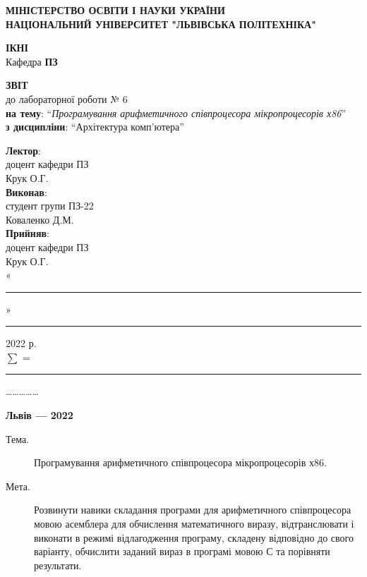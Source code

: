\documentclass{article}
\newcommand\subject{Архітектура комп'ютера}
\newcommand\lecturer{доцент кафедри ПЗ\\Крук О.Г.}
\newcommand\teacher{доцент кафедри ПЗ\\Крук О.Г.}
\newcommand\mygroup{ПЗ-22}
\newcommand\lab{6}
\newcommand\theme{Програмування арифметичного співпроцесора мікропроцесорів х86}
\newcommand\purpose{Розвинути навики складання програми для арифметичного співпроцесора мовою асемблера для обчислення математичного виразу, відтранслювати і виконати в режимі відлагодження програму, складену відповідно до свого варіанту, обчислити заданий вираз в програмі мовою С та порівняти результати}
\begin{document}
\begin{normalsize}
	\begin{titlepage}
		\thispagestyle{empty}
		\begin{center}
			\textbf{МІНІСТЕРСТВО ОСВІТИ І НАУКИ УКРАЇНИ\\
				НАЦІОНАЛЬНИЙ УНІВЕРСИТЕТ "ЛЬВІВСЬКА ПОЛІТЕХНІКА"}
		\end{center}
		\begin{flushright}
			\textbf{ІКНІ}\\
			Кафедра \textbf{ПЗ}
		\end{flushright}
		\vspace{200pt}
		\begin{center}
			\textbf{ЗВІТ}\\
			\vspace{10pt}
			до лабораторної роботи № \lab\\
			\textbf{на тему}: “\textit{\theme}”\\
			\textbf{з дисципліни}: “\subject”
		\end{center}
		\vspace{112pt}
		\begin{flushright}
			
			\textbf{Лектор}:\\
			\lecturer\\
			\vspace{28pt}
			\textbf{Виконав}:\\
			
			студент групи \mygroup\\
			Коваленко Д.М.\\
			\vspace{28pt}
			\textbf{Прийняв}:\\
			
			\teacher\\
			
			\vspace{28pt}
			«\rule{1cm}{0.15mm}» \rule{1.5cm}{0.15mm} 2022 р.\\
			$\sum$ = \rule{1cm}{0.15mm}……………\\
			
		\end{flushright}
		\vspace{\fill}
		\begin{center}
			\textbf{Львів — 2022}
		\end{center}
	\end{titlepage}
		
	\begin{description}
		\item[Тема.] \theme.
		\item[Мета.] \purpose.
	\end{description}


\end{normalsize}
\end{document}
